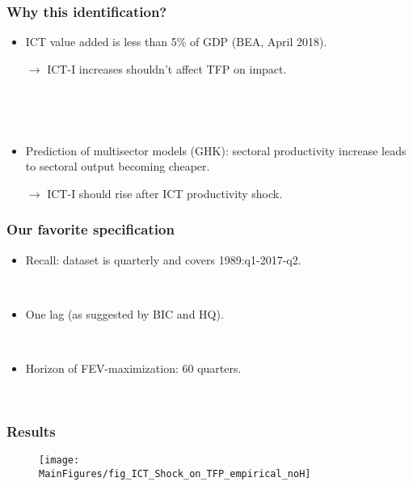 \documentclass{beamer}
\def \MainFigures{../Draft_Summer2018/MainFigures}
\begin{document}
\begin{frame}
	\frametitle{Why this identification?}
	
	\begin{itemize}
	\item ICT value added is less than 5\% of GDP (BEA, April 2018). 
	
	$\rightarrow$ ICT-I increases shouldn't affect TFP on impact.
	
	\
	
	\
	
	\item Prediction of multisector models (GHK): sectoral productivity increase leads to sectoral output becoming cheaper. 
	
	$\rightarrow$ ICT-I should rise after ICT productivity shock.
	\end{itemize}

\end{frame}
\begin{frame}
	\frametitle{Our favorite specification}
	
	\begin{itemize}
	\item Recall: dataset is quarterly and covers 1989:q1-2017-q2.
	
	\
	
	\item One lag (as suggested by BIC and HQ).
	
	\
	
	\item Horizon of FEV-maximization: 60 quarters.
	
	\
	
	
	\end{itemize}

	
\end{frame}

\begin{frame}
	\frametitle{Results}
	
\begin{figure}[h!]
\begin{center}
\texttt{[image: \\MainFigures/fig\_ICT\_Shock\_on\_TFP\_empirical\_noH]}
\label{fig:TFP_main}
\end{center}
\end{figure}
	

\end{frame}
\end{document}
